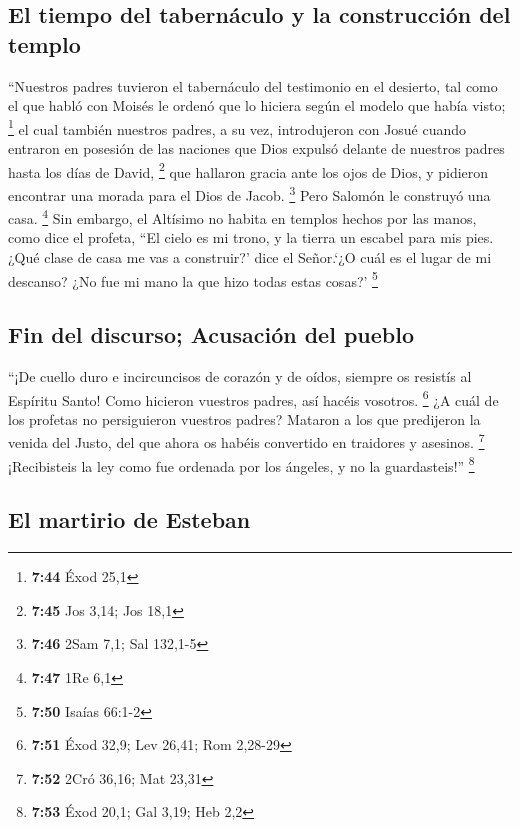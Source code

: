 \hypertarget{el-tiempo-del-tabernuxe1culo-y-la-construcciuxf3n-del-templo}{%
\subsection{El tiempo del tabernáculo y la construcción del
templo}\label{el-tiempo-del-tabernuxe1culo-y-la-construcciuxf3n-del-templo}}

 ``Nuestros padres tuvieron el tabernáculo del testimonio
en el desierto, tal como el que habló con Moisés le ordenó que lo
hiciera según el modelo que había visto; \footnote{\textbf{7:44} Éxod
  25,1}  el cual también nuestros padres, a su vez,
introdujeron con Josué cuando entraron en posesión de las naciones que
Dios expulsó delante de nuestros padres hasta los días de David,
\footnote{\textbf{7:45} Jos 3,14; Jos 18,1}  que hallaron
gracia ante los ojos de Dios, y pidieron encontrar una morada para el
Dios de Jacob. \footnote{\textbf{7:46} 2Sam 7,1; Sal 132,1-5}
 Pero Salomón le construyó una casa. \footnote{\textbf{7:47}
  1Re 6,1}  Sin embargo, el Altísimo no habita en templos
hechos por las manos, como dice el profeta,  ``El cielo
es mi trono, y la tierra un escabel para mis pies. ¿Qué clase de casa me
vas a construir?' dice el Señor.`¿O cuál es el lugar de mi descanso?
 ¿No fue mi mano la que hizo todas estas cosas?'
\footnote{\textbf{7:50} Isaías 66:1-2}

\hypertarget{fin-del-discurso-acusaciuxf3n-del-pueblo}{%
\subsection{Fin del discurso; Acusación del
pueblo}\label{fin-del-discurso-acusaciuxf3n-del-pueblo}}

 ``¡De cuello duro e incircuncisos de corazón y de oídos,
siempre os resistís al Espíritu Santo! Como hicieron vuestros padres,
así hacéis vosotros. \footnote{\textbf{7:51} Éxod 32,9; Lev 26,41; Rom
  2,28-29}  ¿A cuál de los profetas no persiguieron
vuestros padres? Mataron a los que predijeron la venida del Justo, del
que ahora os habéis convertido en traidores y asesinos. \footnote{\textbf{7:52}
  2Cró 36,16; Mat 23,31}  ¡Recibisteis la ley como fue
ordenada por los ángeles, y no la guardasteis!'' \footnote{\textbf{7:53}
  Éxod 20,1; Gal 3,19; Heb 2,2}

\hypertarget{el-martirio-de-esteban}{%
\subsection{El martirio de Esteban}\label{el-martirio-de-esteban}}

